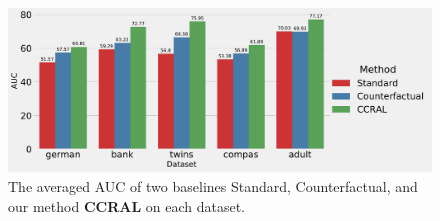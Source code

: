\begin{figure}
\begin{centering}
\includegraphics[scale=0.35]{figs/_plot_svm_auc}
\par\end{centering}
\caption{\label{fig:Classification-AUC}The averaged AUC of two baselines Standard,
Counterfactual, and our method \textbf{CCRAL} on each dataset.}
\end{figure}

